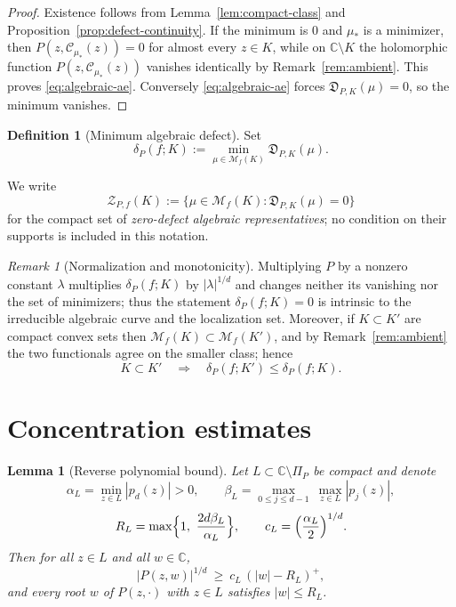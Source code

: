 \documentclass[reqno]{amsart}
\newtheorem{lemma}[theorem]{Lemma}
\theoremstyle{definition}
\newtheorem{definition}[theorem]{Definition}
\theoremstyle{remark}
\newtheorem{remark}[theorem]{Remark}
\newcommand{\bC}{\mathbb C}
\newcommand{\M}{\mathcal M}
\newcommand{\Cauchy}{\mathcal C}
\begin{document}
\begin{proof}
Existence follows from Lemma~\ref{lem:compact-class} and
Proposition~\ref{prop:defect-continuity}.  If the minimum is $0$ and $\mu_*$ is
a minimizer, then $P(z,\Cauchy_{\mu_*}(z))=0$ for almost every $z\in K$, while
on $\bC\setminus K$ the holomorphic function
$P(z,\Cauchy_{\mu_*}(z))$ vanishes identically by
Remark~\ref{rem:ambient}.  This proves
\eqref{eq:algebraic-ae}.  Conversely \eqref{eq:algebraic-ae} forces
$\mathfrak D_{P,K}(\mu)=0$, so the minimum vanishes.
\end{proof}

\begin{definition}[Minimum algebraic defect]
\label{def:delta}
Set
\begin{equation}\label{eq:delta}
 \delta_P(f;K)
 :=\min_{\mu\in\M_f(K)}\mathfrak D_{P,K}(\mu).
\end{equation}
\end{definition}

We write
\begin{equation}\label{eq:zero-set}
 \mathcal Z_{P,f}(K)
 :=\{\mu\in\M_f(K):\mathfrak D_{P,K}(\mu)=0\}
\end{equation}
for the compact set of \emph{zero-defect algebraic representatives}; no
condition on their supports is included in this notation.

\begin{remark}[Normalization and monotonicity]\label{rem:monotone}
Multiplying $P$ by a nonzero constant $\lambda$ multiplies $\delta_P(f;K)$ by
$|\lambda|^{1/d}$ and changes neither its vanishing nor the set of minimizers;
thus the statement $\delta_P(f;K)=0$ is intrinsic to the irreducible algebraic
curve and the localization set.  Moreover, if $K\subset K'$ are compact convex
sets then $\M_f(K)\subset\M_f(K')$, and by Remark~\ref{rem:ambient} the two
functionals agree on the smaller class; hence
\[
 K\subset K'\quad\Longrightarrow\quad \delta_P(f;K')\leq\delta_P(f;K).
\]
\end{remark}

\section{Concentration estimates}\label{sec:quantitative}

\begin{lemma}[Reverse polynomial bound]\label{lem:reverse}
Let $L\subset\bC\setminus\Pi_P$ be compact and denote 
\[
 \alpha_L=\min_{z\in L}|p_d(z)|>0,\qquad
 \beta_L=\max_{0\leq j\leq d-1}\ \max_{z\in L}|p_j(z)| ,
\]
\[
 R_L=\max\Bigl\{1,\ \frac{2d\beta_L}{\alpha_L}\Bigr\},
 \qquad
 c_L=\Bigl(\frac{\alpha_L}{2}\Bigr)^{1/d}.
\]
Then for all $z\in L$ and all $w\in\bC$,
\begin{equation}\label{eq:reverse}
 |P(z,w)|^{1/d}\ \geq\ c_L\,(|w|-R_L)^{+} ,
\end{equation}
and every root $w$ of $P(z,\cdot)$ with $z\in L$ satisfies $|w|\leq R_L$.
\end{lemma}
\end{document}
